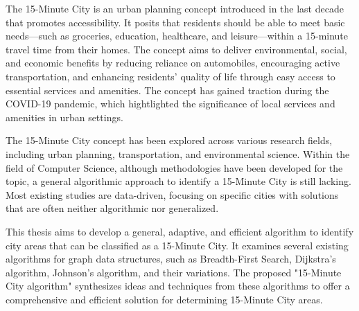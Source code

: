 \begin{Abstract}
\begin{changemargin}{1cm}{1cm}

The 15-Minute City is an urban planning concept introduced in the last decade that promotes accessibility. It posits that residents should be able to meet basic needs—such as groceries, education, healthcare, and leisure—within a 15-minute travel time from their homes. The concept aims to deliver environmental, social, and economic benefits by reducing reliance on automobiles, encouraging active transportation, and enhancing residents' quality of life through easy access to essential services and amenities. The concept has gained traction during the COVID-19 pandemic, which hightlighted the significance of local services and amenities in urban settings.

\vspace{0.5cm}

The 15-Minute City concept has been explored across various research fields, including urban planning, transportation, and environmental science. Within the field of Computer Science, although methodologies have been developed for the topic, a general algorithmic approach to identify a 15-Minute City is still lacking. Most existing studies are data-driven, focusing on specific cities with solutions that are often neither algorithmic nor generalized.

\vspace{0.5cm}

This thesis aims to develop a general, adaptive, and efficient algorithm to identify city areas that can be classified as a 15-Minute City. It examines several existing algorithms for graph data structures, such as Breadth-First Search, Dijkstra's algorithm, Johnson's algorithm, and their variations. The proposed "15-Minute City algorithm" synthesizes ideas and techniques from these algorithms to offer a comprehensive and efficient solution for determining 15-Minute City areas.

\end{changemargin}
\end{Abstract}